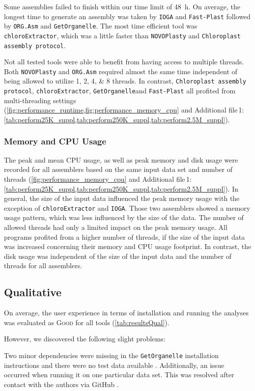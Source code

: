 \documentclass{bmcart}
\newcommand{\formatprogramnames}[1]{\texttt{#1}}
\newcommand{\ce}{\formatprogramnames{chloroExtractor}}
\newcommand{\oa}{\formatprogramnames{ORG.Asm}}
\newcommand{\fp}{\formatprogramnames{Fast-Plast}}
\newcommand{\ioga}{\formatprogramnames{IOGA}}
\newcommand{\np}{\formatprogramnames{NOVOPlasty}}
\newcommand{\go}{\formatprogramnames{GetOrganelle}}
\newcommand{\cassp}{\formatprogramnames{Chloroplast assembly protocol}}
\newcommand{\good}{\textsc{Good}}
\newcommand{\crefsupp}[1]{Additional file\,1: \cref{#1}}
\begin{document}
Some assemblies failed to finish within our time limit of \SI{48}{\hour}. 
On average, the longest time to generate an assembly was taken by \ioga{} and \fp{} followed by \oa{} and \go{}.
The most time efficient tool was \ce{}, which was a little faster than \np{} and \cassp{}.

Not all tested tools were able to benefit from having access to multiple threads.
Both \np{} and \oa{} required almost the same time independent of being allowed to utilize \numlist[list-final-separator={, or }]{1;2;4;8} threads.
In contrast, \cassp{}, \ce{}, \go  and \fp{} all profited from multi-threading settings  (\cref{fig:performance_runtime,fig:performance_memory_cpu} and \crefsupp{tab:perform25K_suppl,tab:perform250K_suppl,tab:perform2.5M_suppl}).

\subsubsection*{Memory and CPU Usage }
The peak and mean CPU usage, as well as peak memory and disk usage were recorded for all assemblers based on the same input data set and number of threads  (\cref{fig:performance_memory_cpu} and \crefsupp{tab:perform25K_suppl,tab:perform250K_suppl,tab:perform2.5M_suppl}).
In general, the size of the input data influenced the peak memory usage with the exception of \ce{} and \ioga{}.
Those two assemblers showed a memory usage pattern, which was less influenced by the size of the data.
The number of allowed threads had only a limited impact on the peak memory usage.
All programs profited from a higher number of threads, if the size of the input data was increased concerning their memory and CPU usage footprint.
In contrast, the disk usage was independent of the size of the input data and the number of threads for all assemblers.

\subsection*{Qualitative}

On average, the user experience in terms of installation and running the analyses was evaluated as \good{} for all tools (\cref{tab:resultsQual}).

However, we discovered the following slight problems: 

Two minor dependencies were missing in the \go{} installation instructions and there were no test data available \cite{go_issue_10}.
Additionally, an issue occurred when running it on one particular  data set.
This was resolved after contact with the authors via GitHub \cite{go_issue_11}.
%
\end{document}
